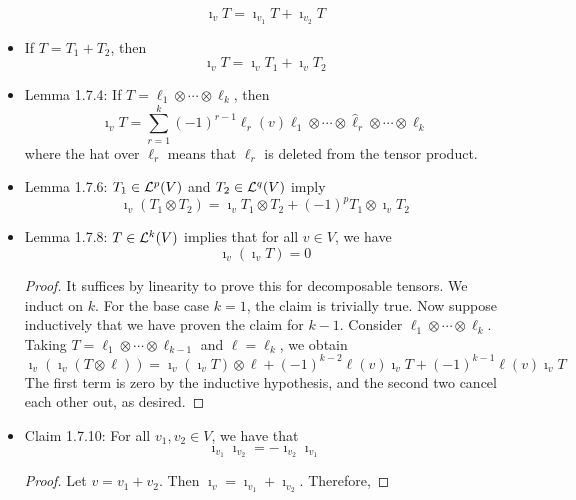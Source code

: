 \documentclass[../notes.tex]{subfiles}
\begin{document}
\begin{itemize}
    \begin{equation*}
        \imath_vT = \imath_{v_1}T+\imath_{v_2}T
    \end{equation*}
    \item If $T=T_1+T_2$, then
    \begin{equation*}
        \imath_vT = \imath_vT_1+\imath_vT_2
    \end{equation*}
    \item Lemma 1.7.4: If $T=\ell_1\otimes\cdots\otimes\ell_k$, then
    \begin{equation*}
        \imath_vT = \sum_{r=1}^k(-1)^{r-1}\ell_r(v)\ell_1\otimes\cdots\otimes\hat{\ell}_r\otimes\cdots\otimes\ell_k
    \end{equation*}
    where the hat over $\ell_r$ means that $\ell_r$ is deleted from the tensor product.
    \item Lemma 1.7.6: $T_1\in\lin[p]{V}$ and $T_2\in\lin[q]{V}$ imply
    \begin{equation*}
        \imath_v(T_1\otimes T_2) = \imath_vT_1\otimes T_2+(-1)^pT_1\otimes\imath_vT_2
    \end{equation*}
    \item Lemma 1.7.8: $T\in\lin[k]{V}$ implies that for all $v\in V$, we have
    \begin{equation*}
        \imath_v(\imath_vT) = 0
    \end{equation*}
    \begin{proof}
        It suffices by linearity to prove this for decomposable tensors. We induct on $k$. For the base case $k=1$, the claim is trivially true. Now suppose inductively that we have proven the claim for $k-1$. Consider $\ell_1\otimes\cdots\otimes\ell_k$. Taking $T=\ell_1\otimes\cdots\otimes\ell_{k-1}$ and $\ell=\ell_k$, we obtain
        \begin{equation*}
            \imath_v(\imath_v(T\otimes\ell)) = \imath_v(\imath_vT)\otimes\ell+(-1)^{k-2}\ell(v)\imath_vT+(-1)^{k-1}\ell(v)\imath_vT
        \end{equation*}
        The first term is zero by the inductive hypothesis, and the second two cancel each other out, as desired.
    \end{proof}
    \item Claim 1.7.10: For all $v_1,v_2\in V$, we have that
    \begin{equation*}
        \imath_{v_1}\imath_{v_2} = -\imath_{v_2}\imath_{v_1}
    \end{equation*}
    \begin{proof}
        Let $v=v_1+v_2$. Then $\imath_v=\imath_{v_1}+\imath_{v_2}$. Therefore,

\end{proof}
\end{itemize}
\end{document}
